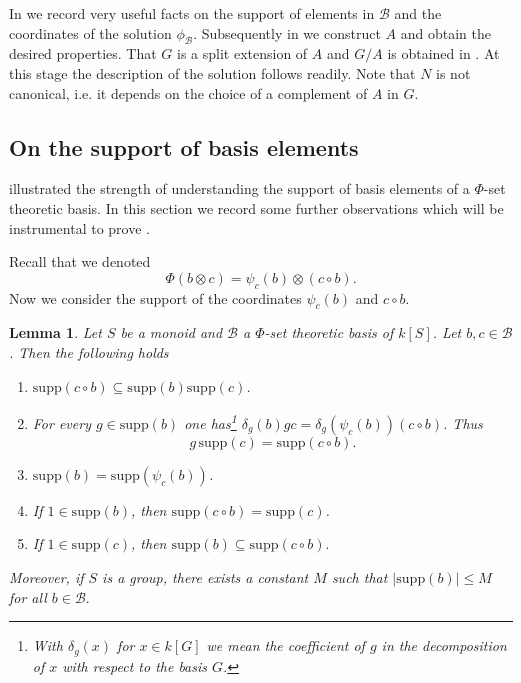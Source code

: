 \documentclass[a4paper,10pt]{amsart}
\newtheorem{lemma}{Lemma}[section]
\theoremstyle{definition}
\theoremstyle{remark}
\newcommand{\Supp}{\mathrm{supp}}
\newcommand\mc{\mathcal}
\begin{document}
In  we record very useful facts on the support of elements in $\mc{B}$ and the coordinates of the solution  $\phi_{\mc{B}}$. Subsequently in  we construct $A$ and obtain the desired properties. That $G$ is a split extension of $A$ and $G/A$ is obtained in . At this stage the description of the solution follows readily. Note that $N$ is not canonical, i.e. it depends on the choice of a complement of $A$ in $G$. 



\subsection{On the support of basis elements}\label{subsectie support }

 illustrated the strength of understanding the support of basis elements of a $\Phi$-set theoretic basis. In this section we record some further observations which will be instrumental to prove .

Recall that we denoted 
$$\Phi(b\otimes c)=\psi_c(b)\otimes (c\circ b).$$
Now we consider the support of the coordinates $\psi_c(b)$ and $c\circ b$.

\begin{lemma}\label{lem:support-preserve}
 Let $S$ be a monoid and $\mc{B}$ a $\Phi$-set theoretic basis of $k[S]$. Let $b,c\in \mc{B}$. Then the following holds
    \begin{enumerate}
    \item\label{suppd} $\Supp(c\circ b)\subseteq \Supp(b)\Supp(c)$.
    \item\label{gsuppb} For every $g\in \Supp(b)$ one has\footnote{With $\delta_g(x)$ for $x \in k[G]$ we mean the coefficient of $g$ in the decomposition of $x$ with respect to the basis $G$.} $\delta_g(b)gc= \delta_g(\psi_c(b))  (c \circ b)$. Thus 
    $$g\, \Supp(c) = \Supp (c\circ b).$$
    \item\label{supp first coord} $\Supp(b)=\Supp(\psi_c(b))$.
    \item\label{If 1 support b} If $1 \in \Supp(b)$, then $\Supp(c \circ b) = \Supp(c)$.
    \item\label{If 1 support c} If $1 \in \Supp(c)$, then $\Supp(b) \subseteq \Supp(c \circ b).$
    \end{enumerate}
Moreover, if $S$ is a group, there exists a constant $M$ such that $|\Supp(b)| \leq M$ for all $b \in \mc{B}.$
\end{lemma}
\end{document}
